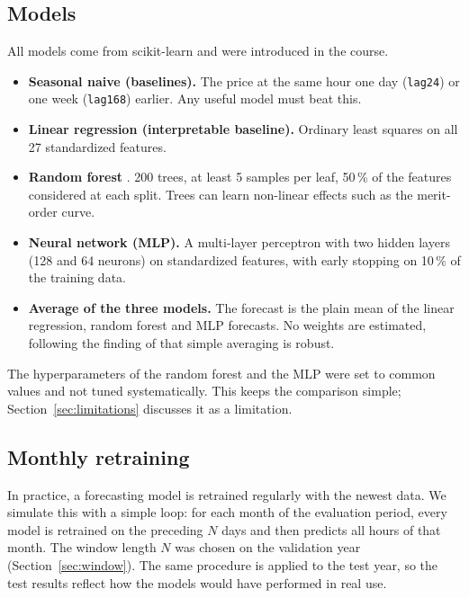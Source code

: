\documentclass[12pt,oneside]{article}
\begin{document}
\subsection{Models}

All models come from scikit-learn \citep{pedregosa2011} and were introduced in the course.

\begin{itemize}
    \item \textbf{Seasonal naive (baselines).} The price at the same hour one day (\texttt{lag24}) or one week (\texttt{lag168}) earlier. Any useful model must beat this.
    \item \textbf{Linear regression (interpretable baseline).} Ordinary least squares on all 27 standardized features.
    \item \textbf{Random forest} \citep{breiman2001}. 200 trees, at least 5 samples per leaf, 50\,\% of the features considered at each split. Trees can learn non-linear effects such as the merit-order curve.
    \item \textbf{Neural network (MLP).} A multi-layer perceptron with two hidden layers (128 and 64 neurons) on standardized features, with early stopping on 10\,\% of the training data.
    \item \textbf{Average of the three models.} The forecast is the plain mean of the linear regression, random forest and MLP forecasts. No weights are estimated, following the finding of \citet{nowotarski2014} that simple averaging is robust.
\end{itemize}

The hyperparameters of the random forest and the MLP were set to common values and not tuned systematically. This keeps the comparison simple; Section~\ref{sec:limitations} discusses it as a limitation.

\subsection{Monthly retraining} \label{sec:rolling}

In practice, a forecasting model is retrained regularly with the newest data. We simulate this with a simple loop: for each month of the evaluation period, every model is retrained on the preceding $N$ days and then predicts all hours of that month. The window length $N$ was chosen on the validation year (Section~\ref{sec:window}). The same procedure is applied to the test year, so the test results reflect how the models would have performed in real use.
\end{document}
